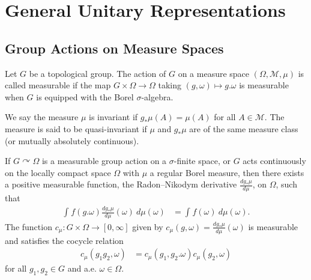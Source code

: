 \documentclass[10pt]{mypackage}
\begin{document}
\RaggedRight
\section{General Unitary Representations}%
\subsection{Group Actions on Measure Spaces}%
Let $G$ be a topological group. The action of $G$ on a measure space $\left( \Omega,\mathcal{M},\mu \right)$ is called measurable if the map $G\times\Omega\to \Omega$ taking $\left( g,\omega \right)\mapsto g.\omega$ is measurable when $G$ is equipped with the Borel $\sigma$-algebra.

We say the measure $\mu$ is invariant if $g_{\ast}\mu(A) = \mu(A)$ for all $A\in \mathcal{M}$. The measure is said to be quasi-invariant if $\mu$ and $g_{\ast}\mu$ are of the same measure class (or mutually absolutely continuous).

If $G\curvearrowright \Omega$ is a measurable group action on a $\sigma$-finite space, or $G$ acts continuously on the locally compact space $\Omega$ with $\mu$ a regular Borel measure, then there exists a positive measurable function, the Radon--Nikodym derivative $\frac{dg_{\ast}\mu}{d\mu}$, on $\Omega$, such that
\begin{align*}
  \int_{}^{} f\left( g.\omega \right)\frac{dg_{\ast}\mu}{d\mu}(\omega)\:d\mu(\omega) &= \int_{}^{} f(\omega)\:d\mu(\omega).
\end{align*}
The function $c_{\mu}\colon G\times \Omega\to [0,\infty]$ given by $c_{\mu}\left( g,\omega \right) = \frac{dg_{\ast}\mu}{d\mu}(\omega)$ is measurable and satisfies the cocycle relation
\begin{align*}
  c_{\mu}\left( g_1g_2,\omega \right) &= c_{\mu}\left( g_1,g_2.\omega \right)c_{\mu}\left( g_{2},\omega \right)
\end{align*}
for all $g_1,g_2\in G$ and a.e. $\omega\in \Omega$.
\end{document}
